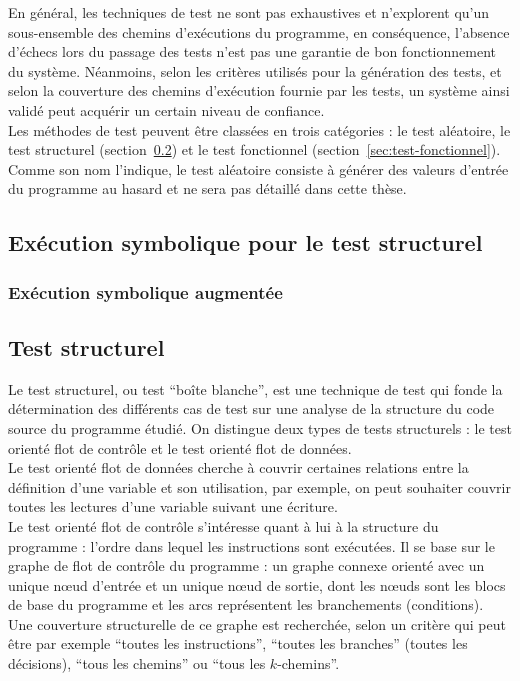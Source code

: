 En général, les techniques de test ne sont pas exhaustives et n'explorent qu'un
sous-ensemble des chemins d'exécutions du programme, en conséquence, l’absence
d’échecs lors du passage des tests n’est pas une garantie de bon fonctionnement
du système. Néanmoins, selon les critères utilisés pour la génération des
tests, et selon la couverture des chemins d'exécution fournie par les tests, un
système ainsi validé peut acquérir un certain niveau de confiance.\\

Les méthodes de test peuvent être classées en trois catégories : le test
aléatoire, le test structurel (section~\ref{sec:test-structurel}) et le test
fonctionnel (section~\ref{sec:test-fonctionnel}). Comme son nom l'indique, le
test aléatoire consiste à générer des valeurs d'entrée du programme au hasard et
ne sera pas détaillé dans cette thèse.



\subsection{Exécution symbolique pour le test structurel}
\label{sec:exec-sym}



\subsubsection{Exécution symbolique augmentée}



\subsection{Test structurel}
\label{sec:test-structurel}

Le test structurel, ou test ``boîte blanche'', est une technique de test qui
fonde la détermination des différents cas de test sur une analyse de la
structure du code source du programme étudié. On distingue deux types de tests
structurels : le test orienté flot de contrôle et le test orienté flot de
données.\\

Le test orienté flot de données cherche à couvrir certaines relations entre la
définition d’une variable et son utilisation, par exemple, on peut souhaiter
couvrir toutes les lectures d'une variable suivant une écriture.\\

Le test orienté flot de contrôle s’intéresse quant à lui à la structure du
programme : l'ordre dans lequel les instructions sont exécutées. Il se base sur
le graphe de flot de contrôle du programme : un graphe connexe orienté avec un
unique n\oe{}ud d’entrée et un unique n\oe{}ud de sortie, dont les n\oe{}uds
sont les blocs de base du programme et les arcs représentent les branchements
(conditions). Une couverture structurelle de ce graphe est recherchée, selon un
critère qui peut être par exemple ``toutes les instructions'',
``toutes les branches'' (toutes les décisions), ``tous les chemins'' ou
``tous les $k$-chemins''.\\


